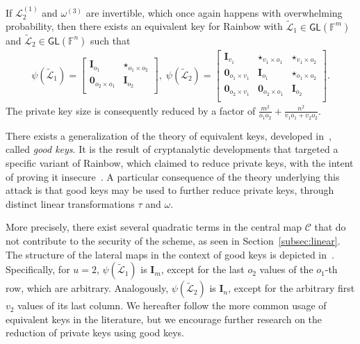 \documentclass[12pt, a4paper, oneside]{memoir}
\theoremstyle{definition}
\begin{document}
If $\mathcal{L}_{2}^{(1)}$ and $\omega^{(3)}$ are invertible, which once again happens with overwhelming probability, then there exists an equivalent key for Rainbow with $\widetilde{\mathcal{L}}_{1} \in \mathsf{GL}(\mathbb{F}^{m})$ and $\widetilde{\mathcal{L}}_{2} \in \mathsf{GL}(\mathbb{F}^{n})$ such that
\begin{align}
  \psi(\widetilde{\mathcal{L}}_{1}) =
  \begin{bmatrix}
    \mathbf{I}_{o_{1}} & \star_{o_{1} \times o_{2}} \\
    \mathbf{0}_{o_{2} \times o_{1}} & \mathbf{I}_{o_{2}} \\
  \end{bmatrix},\;
  \psi(\widetilde{\mathcal{L}}_{2}) =
  \begin{bmatrix}
    \mathbf{I}_{v_{1}} & \star_{v_{1} \times o_{1}} & \star_{v_{1} \times o_{2}} \\
    \mathbf{0}_{o_{1} \times v_{1}} & \mathbf{I}_{o_{1}} & \star_{o_{1} \times o_{2}} \\
    \mathbf{0}_{o_{2} \times v_{1}} & \mathbf{0}_{o_{2} \times o_{1}} & \mathbf{I}_{o_{2}} \\
  \end{bmatrix}.
\end{align}
The private key size is consequently reduced by a factor of $\frac{m^{2}}{o_{1} o_{2}} + \frac{n^{2}}{v_{1} o_{1} + v_{2} o_{2}}$.

There exists a generalization of the theory of equivalent keys, developed in~\cite{Thomae:201306}, called \emph{good keys}. It is the result of cryptanalytic developments that targeted a specific variant of Rainbow, which claimed to reduce private keys, with the intent of proving it insecure~\cite{Thomae:201207}. A particular consequence of the theory underlying this attack is that good keys may be used to further reduce private keys, through distinct linear transformations $\tau$ and $\omega$. 

More precisely, there exist several quadratic terms in the central map $\mathcal{C}$ that do not contribute to the security of the scheme, as seen in Section~\ref{subsec:linear}. The structure of the lateral maps in the context of good keys is depicted in~\cite[Figure 3]{Shim:202001}. Specifically, for $u = 2$, $\psi(\widetilde{\mathcal{L}}_{1})$ is $\mathbf{I}_{m}$, except for the last $o_{2}$ values of the $o_{1}$-th row, which are arbitrary. Analogously, $\psi(\widetilde{\mathcal{L}}_{2})$ is $\mathbf{I}_{n}$, except for the arbitrary first $v_{2}$ values of its last column. We hereafter follow the more common usage of equivalent keys in the literature, but we encourage further research on the reduction of private keys using good keys.
\end{document}
